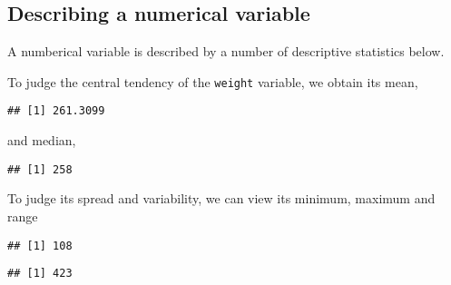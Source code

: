 \documentclass[]{book}
\newenvironment{Shaded}{\begin{snugshade}}{\end{snugshade}}
\newcommand{\KeywordTok}[1]{\textcolor[rgb]{0.13,0.29,0.53}{\textbf{{#1}}}}
\newcommand{\NormalTok}[1]{{#1}}
\theoremstyle{definition}
\theoremstyle{definition}
\theoremstyle{remark}
\begin{document}
\subsection{Describing a numerical
variable}\label{describing-a-numerical-variable}

A numberical variable is described by a number of descriptive statistics
below.

To judge the central tendency of the \texttt{weight} variable, we obtain
its mean,

\begin{Shaded}
\end{Shaded}

\begin{verbatim}
## [1] 261.3099
\end{verbatim}

and median,

\begin{Shaded}
\end{Shaded}

\begin{verbatim}
## [1] 258
\end{verbatim}

To judge its spread and variability, we can view its minimum, maximum
and range

\begin{Shaded}
\end{Shaded}

\begin{verbatim}
## [1] 108
\end{verbatim}

\begin{Shaded}
\end{Shaded}

\begin{verbatim}
## [1] 423
\end{verbatim}
\end{document}
